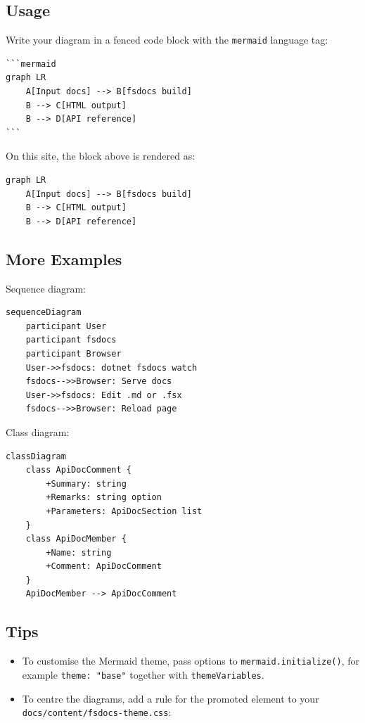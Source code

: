\documentclass{article}
\begin{document}
\subsection*{Usage}



Write your diagram in a fenced code block with the \texttt{mermaid} language tag:
\begin{lstlisting}
```mermaid
graph LR
    A[Input docs] --> B[fsdocs build]
    B --> C[HTML output]
    B --> D[API reference]
```

\end{lstlisting}


On this site, the block above is rendered as:
\begin{lstlisting}
graph LR
    A[Input docs] --> B[fsdocs build]
    B --> C[HTML output]
    B --> D[API reference]

\end{lstlisting}
\subsection*{More Examples}



Sequence diagram:
\begin{lstlisting}
sequenceDiagram
    participant User
    participant fsdocs
    participant Browser
    User->>fsdocs: dotnet fsdocs watch
    fsdocs-->>Browser: Serve docs
    User->>fsdocs: Edit .md or .fsx
    fsdocs-->>Browser: Reload page

\end{lstlisting}


Class diagram:
\begin{lstlisting}
classDiagram
    class ApiDocComment {
        +Summary: string
        +Remarks: string option
        +Parameters: ApiDocSection list
    }
    class ApiDocMember {
        +Name: string
        +Comment: ApiDocComment
    }
    ApiDocMember --> ApiDocComment

\end{lstlisting}
\subsection*{Tips}

\begin{itemize}
\item To customise the Mermaid theme, pass options to \texttt{mermaid.initialize()}, for example \texttt{theme: "base"} together with \texttt{themeVariables}.

\item To centre the diagrams, add a rule for the promoted element to your \texttt{docs/content/fsdocs-theme.css}:

\end{itemize}
\end{document}
